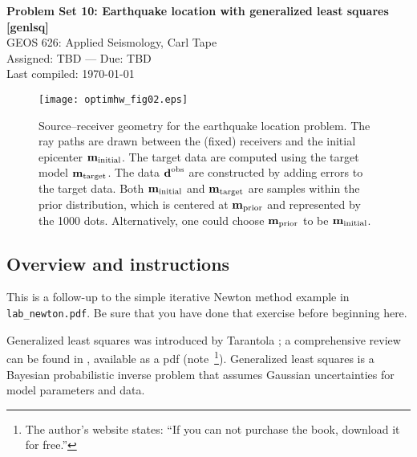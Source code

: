 \documentclass[11pt,titlepage,fleqn]{article}
\begin{document}

\begin{spacing}{1.2}
\centering
{\large \bf Problem Set 10: Earthquake location with generalized least squares [genlsq]} \\
GEOS 626: Applied Seismology, Carl Tape \\
Assigned: TBD --- Due: TBD \\
Last compiled: \today
\end{spacing}


\vspace{1cm}
\begin{figure}[h]
\centering
\texttt{[image: optimhw\_fig02.eps]}
\caption[Source-receiver geometry]
{{
Source--receiver geometry for the earthquake location problem. The ray paths are drawn between the (fixed) receivers and the initial epicenter $\mbox{${\bf m}$}_{\rm initial}$.
The target data are computed using the target model \textcolor{red}{$\mbox{${\bf m}$}_{\rm target}$}.
The data $\mbox{${\bf d}$}^{\rm obs}$ are constructed by adding errors to the target data.
Both $\mbox{${\bf m}$}_{\rm initial}$ and $\mbox{${\bf m}$}_{\rm target}$ are samples within the prior distribution, which is centered at \textcolor{blue}{$\mbox{${\bf m}$}_{\rm prior}$} and represented by the 1000 dots. Alternatively, one could choose \textcolor{blue}{$\mbox{${\bf m}$}_{\rm prior}$} to be $\mbox{${\bf m}$}_{\rm initial}$.
\label{fig:srcrec}
}}
\end{figure}


\pagebreak
\subsection*{Overview and instructions}

This is a follow-up to the simple iterative Newton method example in \verb+lab_newton.pdf+. Be sure that you have done that exercise before beginning here.

Generalized least squares was introduced by Tarantola \citep{TarantolaValette1982quest,TarantolaValette1982nonlinear}; a comprehensive review can be found in \citet{Tarantola2005}, available as a pdf (note~\footnote{The author's website states: ``If you can not purchase the book, download it for free.''}). Generalized least squares is a Bayesian probabilistic inverse problem that assumes Gaussian uncertainties for model parameters and data.
\end{document}
